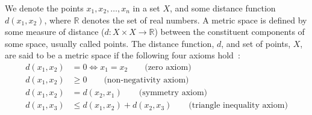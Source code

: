 \documentclass[preprint,12pt]{article}
\begin{document}
We denote the points $x_1,x_2,\ldots,x_n$  in a set $X$, and some distance function $d(x_1,x_2)$, where  $\mathbb{R}$ denotes the set of real numbers. 
A metric space is defined by some measure of distance ($d:X \times X \rightarrow \mathbb{R}$) between the constituent components of some space, usually called points. 
The distance function, $d$, and set of points,  $X$, are said to be a metric space if the following four axioms hold~\cite{metrics}:
\begin{align}
    d(x_1,x_2) &= 0 \iff x_1 = x_2 \qquad\text{(zero axiom)} \label{eq:axioms_zero}\\
    d(x_1,x_2) &\geq 0 \qquad\text{(non-negativity axiom)} \\
    d(x_1,x_2) &= d(x_2, x_1) \qquad\text{(symmetry axiom)} \\
    d(x_1,x_3) & \leq d(x_1,x_2) + d(x_2,x_3) \qquad\text{(triangle inequality axiom)} \label{eq:axiom_triangle_inequality}
\end{align}
\end{document}
